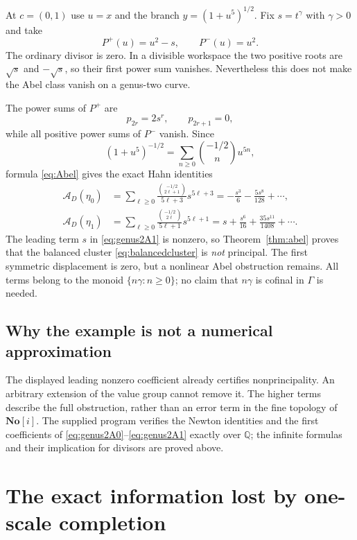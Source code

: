 \documentclass[11pt,letterpaper]{article}
\numberwithin{equation}{section}
\theoremstyle{definition}
\theoremstyle{remark}
\newcommand{\Q}{\mathbb Q}
\newcommand{\No}{\mathbf{No}}
\begin{document}
At $c=(0,1)$ use $u=x$ and the branch
$y=(1+u^5)^{1/2}$. Fix $s=t^\gamma$ with $\gamma>0$ and take
\begin{equation}
 P^+(u)=u^2-s,\qquad P^-(u)=u^2.
 \label{eq:balancedcluster}
\end{equation}
The ordinary divisor is zero. In a divisible workspace the two positive
roots are $\sqrt{s}$ and $-\sqrt{s}$, so their first power sum vanishes.
Nevertheless this does not make the Abel class vanish on a genus-two
curve.

The power sums of $P^+$ are
\[
 p_{2r}=2s^r,\qquad p_{2r+1}=0,
\]
while all positive power sums of $P^-$ vanish. Since
\[
 (1+u^5)^{-1/2}=\sum_{n\ge0}\binom{-1/2}{n}u^{5n},
\]
formula \eqref{eq:Abel} gives the exact Hahn identities
\begin{align}
 \mathcal A_D(\eta_0)
 &=\sum_{\ell\ge0}
   \frac{\binom{-1/2}{2\ell+1}}{5\ell+3}s^{5\ell+3}
   =-\frac{s^3}{6}-\frac{5s^8}{128}+\cdots,\label{eq:genus2A0}\\
 \mathcal A_D(\eta_1)
 &=\sum_{\ell\ge0}
   \frac{\binom{-1/2}{2\ell}}{5\ell+1}s^{5\ell+1}
   =s+\frac{s^6}{16}+\frac{35s^{11}}{1408}+\cdots.
 \label{eq:genus2A1}
\end{align}
The leading term $s$ in \eqref{eq:genus2A1} is nonzero, so
Theorem~\ref{thm:abel} proves that the balanced cluster
\eqref{eq:balancedcluster} is \emph{not} principal.
The first symmetric displacement is zero, but a nonlinear Abel
obstruction remains. All terms belong to the monoid $\{n\gamma:n\ge0\}$;
no claim that $n\gamma$ is cofinal in $\Gamma$ is needed.

\subsection{Why the example is not a numerical approximation}
The displayed leading nonzero coefficient already certifies
nonprincipality. An arbitrary extension of the value group cannot
remove it. The higher terms describe the full obstruction, rather
than an error term in the fine topology of $\No[i]$.
The supplied program verifies the Newton identities and the first
coefficients of \eqref{eq:genus2A0}--\eqref{eq:genus2A1} exactly over
$\Q$; the infinite formulas and their implication for divisors are
proved above.

\section{The exact information lost by one-scale completion}
\label{sec:adic}
\end{document}
